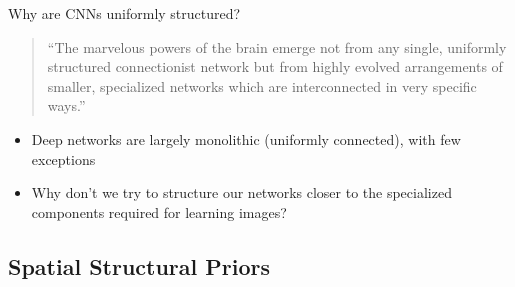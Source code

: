 \documentclass[t,xcolor=dvipsnames]{beamer}
\begin{document}
\begin{frame}{Why are CNNs uniformly structured?}
\begin{quote}
``The marvelous powers of the brain emerge not from any single, uniformly structured
connectionist network but from highly evolved arrangements of smaller, specialized
networks which are interconnected in very specific ways.''\\
\end{quote}
\begin{itemize}
    \item Deep networks are largely monolithic (uniformly connected), with few exceptions
    \item Why don't we try to structure our networks closer to the specialized components required for learning images?
\end{itemize}
\end{frame}

\subsection{Spatial Structural Priors}

\end{document}
